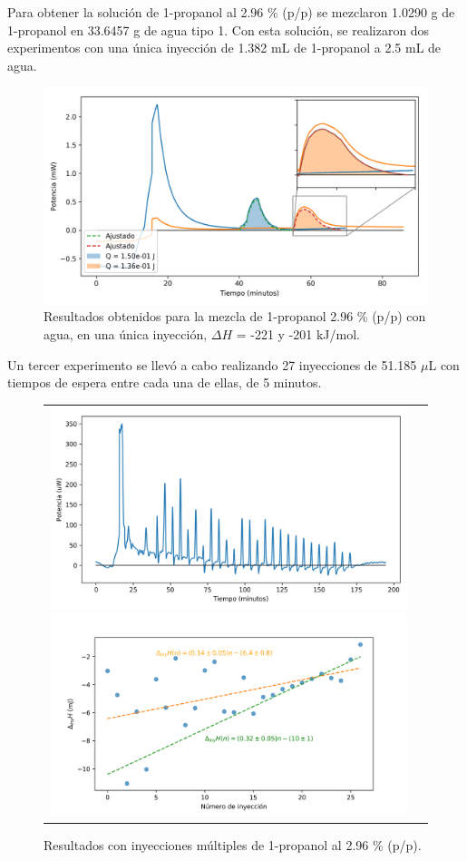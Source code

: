 \documentclass[a0]{sciposter}
\newcommand{\figwidth}{0.7\linewidth}
\begin{document}
\begin{multicols}{3}
	Para obtener la soluci\'on de 1-propanol al 2.96 \% (p/p) se mezclaron 1.0290 g de 1-propanol en 33.6457 g de agua tipo 1. Con esta soluci\'on, se realizaron dos experimentos con una \'unica inyecci\'on de 1.382 mL de 1-propanol a 2.5 mL de agua.
	
	\begin{figure}[h]
		\centering
		\includegraphics[width=\figwidth]{../Data/ChemicalCalibrations/singlePropanol}
		\caption{Resultados obtenidos para la mezcla de 1-propanol 2.96 \% (p/p) con agua, en una \'unica inyecci\'on, $\Delta H$ = -221 y -201 kJ/mol.}
	\end{figure}

	Un tercer experimento se llev\'o a cabo realizando 27 inyecciones de 51.185 $\mu$L con tiempos de espera entre cada una de ellas, de 5 minutos.
	
	\begin{figure}[h]
		\centering
		\begin{tabular}{cc}
			\includegraphics[width=0.47\linewidth]{../Data/ChemicalCalibrations/multiple}
			\includegraphics[width=0.53\linewidth]{../Data/ChemicalCalibrations/multipleInt}
		\end{tabular}
		\caption{Resultados con inyecciones m\'ultiples de 1-propanol al 2.96 \% (p/p).}
	\end{figure}


\end{multicols}
\end{document}
